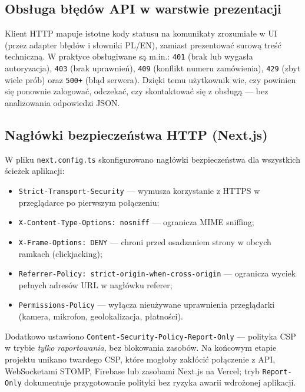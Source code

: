 \documentclass[12pt,a4paper]{report}
\newenvironment{calosc}{%
  \Needspace{17\baselineskip}%
  \begin{samepage}%
}{%
  \end{samepage}%
}
\begin{document}
\begin{calosc}
\section{Obsługa błędów API w warstwie prezentacji}

Klient HTTP mapuje istotne kody statusu na komunikaty zrozumiałe w UI (przez adapter błędów i słowniki PL/EN), zamiast prezentować surową treść techniczną. W praktyce obsługiwane są m.in.: \texttt{401} (brak lub wygasła autoryzacja), \texttt{403} (brak uprawnień), \texttt{409} (konflikt numeru zamówienia), \texttt{429} (zbyt wiele prób) oraz \texttt{500+} (błąd serwera). Dzięki temu użytkownik wie, czy powinien się ponownie zalogować, odczekać, czy skontaktować się z obsługą --- bez analizowania odpowiedzi JSON.
\end{calosc}

\begin{calosc}
\section{Nagłówki bezpieczeństwa HTTP (Next.js)}

W pliku \texttt{next.config.ts} skonfigurowano nagłówki bezpieczeństwa dla wszystkich ścieżek aplikacji:
\begin{itemize}[noitemsep]
  \item \texttt{Strict-Transport-Security} --- wymusza korzystanie z HTTPS w przeglądarce po pierwszym połączeniu;
  \item \texttt{X-Content-Type-Options: nosniff} --- ogranicza MIME sniffing;
  \item \texttt{X-Frame-Options: DENY} --- chroni przed osadzaniem strony w obcych ramkach (clickjacking);
  \item \texttt{Referrer-Policy: strict-origin-when-cross-origin} --- ogranicza wyciek pełnych adresów URL w nagłówku referer;
  \item \texttt{Permissions-Policy} --- wyłącza nieużywane uprawnienia przeglądarki (kamera, mikrofon, geolokalizacja, płatności).
\end{itemize}

Dodatkowo ustawiono \texttt{Content-Security-Policy-Report-Only} --- polityka CSP w trybie \emph{tylko raportowania}, bez blokowania zasobów. Na końcowym etapie projektu unikano twardego CSP, które mogłoby zakłócić połączenie z API, WebSocketami STOMP, Firebase lub zasobami Next.js na Vercel; tryb \texttt{Report-Only} dokumentuje przygotowanie polityki bez ryzyka awarii wdrożonej aplikacji.
\end{calosc}
\end{document}

